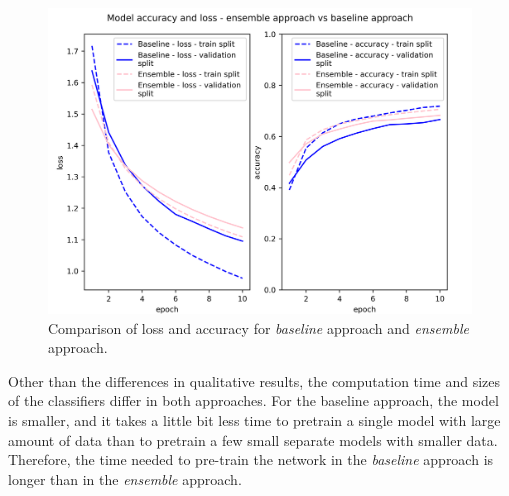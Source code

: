 \documentclass[a4paper,11pt,twoside]{report}
\theoremstyle{definition}
\begin{document}
\FloatBarrier
\begin{figure}[h!t]
\centering
\includegraphics[width=15.5cm]{imgs/baseline_vs_ensemble/loss_acc.png}
\caption{Comparison of loss and accuracy for\textit{ baseline }approach and\textit{ ensemble }approach. }
\label{fig:baseline_vs_ensemble}
\end{figure}
\FloatBarrier

Other than the differences in qualitative results, the computation time and sizes of the classifiers differ in both approaches.
For the baseline approach, the model is smaller, and it takes a little bit less time to pretrain a single model with large amount of data than to pretrain a few small separate models with smaller data. Therefore, the time needed to pre-train  the network in the \textit{baseline} approach is longer than in the \textit{ensemble} approach.
\end{document}
